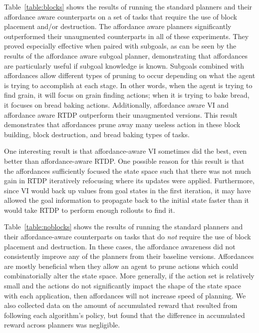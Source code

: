 \documentclass[]{article}
\begin{document}
Table~\ref{table:blocks} shows the results of running the standard
planners and their affordance aware counterparts on a set of tasks
that require the use of block placement and/or destruction.  The
affordance aware planners significantly outperformed their unaugmented
counterparts in all of these experiments. They proved
especially effective when paired with subgoals, as can be seen by the
results of the affordance aware subgoal planner, demonstrating that
affordances are particularly useful if subgoal knowledge is known.
Subgoals combined with affordances allow different types of pruning to
occur depending on what the agent is trying to accomplish at each
stage. In other words, when the agent is trying to find grain, it will
focus on grain finding actions; when it is trying to bake bread, it
focuses on bread baking actions.  Additionally, affordance aware VI
and affordance aware RTDP outperform their unaugmented versions.  This
result demonstrates that affordances prune away many useless action in
these block building, block destruction, and bread baking types of
tasks. 

One interesting result is that affordance-aware VI sometimes
did the best, even better than affordance-aware RTDP. One possible reason for this result is that the
affordances sufficiently focused the state space such that there was
not much gain in RTDP iteratively refocusing where its updates were applied.
Furthermore, since VI would back up values from goal states in the first iteration,
it may have allowed the goal information to propagate back to the initial
state faster than it would take RTDP to perform enough rollouts to find it.

Table~\ref{table:noblocks} shows the results of running the standard
planners and their affordance-aware counterparts on tasks that do {\it
  not} require the use of block placement and destruction.  In these
cases, the affordance awareness did not consistently improve any of
the planners from their baseline versions. Affordances are mostly
beneficial when they allow an agent to prune actions which could
combinatorially alter the state space. More generally, if the action
set is relatively small and the actions do not significantly impact
the shape of the state space with each application, then affordances
will not increase speed of planning.  We also collected data on the
amount of accumulated reward that resulted from following each
algorithm's policy, but found that the difference in accumulated
reward across planners was negligible.
\end{document}
